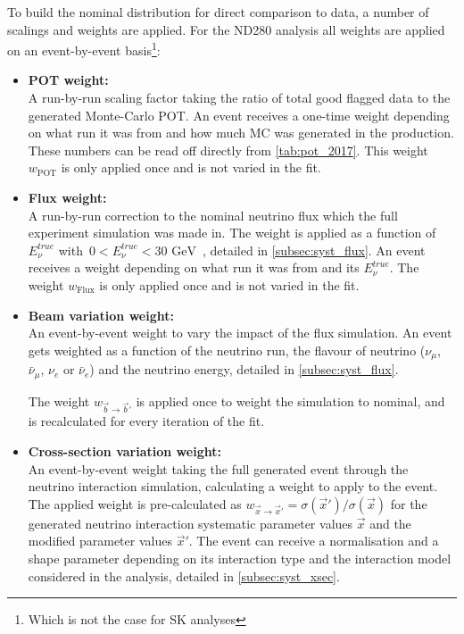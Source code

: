 To build the nominal distribution for direct comparison to data, a number of scalings and weights are applied. For the ND280 analysis all weights are applied on an event-by-event basis\footnote{Which is not the case for SK analyses}:
\begin{itemize}
	\item \textbf{POT weight:} \\
	A run-by-run scaling factor taking the ratio of total good flagged data to the generated Monte-Carlo POT. An event receives a one-time weight depending on what run it was from and how much MC was generated in the production. These numbers can be read off directly from \autoref{tab:pot_2017}. This weight $w_\text{POT}$ is only applied once and is not varied in the fit.
	
	\item \textbf{Flux weight:} \\
	A run-by-run correction to the nominal neutrino flux which the full experiment simulation was made in. The weight is applied as a function of $E_\nu^{true}$ with~$0 < E_\nu^{true} < 30 \text{ GeV}$~, detailed in \autoref{subsec:syst_flux}. An event receives a weight depending on what run it was from and its $E_\nu^{true}$. The weight $w_\text{Flux}$ is only applied once and is not varied in the fit.
	
	\item \textbf{Beam variation weight:} \\
	An event-by-event weight to vary the impact of the flux simulation. An event gets weighted as a function of the neutrino run, the flavour of neutrino ($\nu_\mu$, $\bar{\nu}_\mu$, $\nu_e$ or $\bar{\nu}_e$) and the neutrino energy, detailed in \autoref{subsec:syst_flux}.
	
	The weight $w_{\vec{b}\rightarrow \vec{b}'}$ is applied once to weight the simulation to nominal, and is recalculated for every iteration of the fit.
	
	\item \textbf{Cross-section variation weight:} \\
	An event-by-event weight taking the full generated event through the neutrino interaction simulation, calculating a weight to apply to the event. The applied weight is pre-calculated as $w_{\vec{x} \rightarrow \vec{x}'}=\sigma(\vec{x}')/\sigma(\vec{x})$ for the generated neutrino interaction systematic parameter values $\vec{x}$ and the modified parameter values $\vec{x}'$. The event can receive a normalisation and a shape parameter depending on its interaction type and the interaction model considered in the analysis, detailed in \autoref{subsec:syst_xsec}.
	

\end{itemize}
